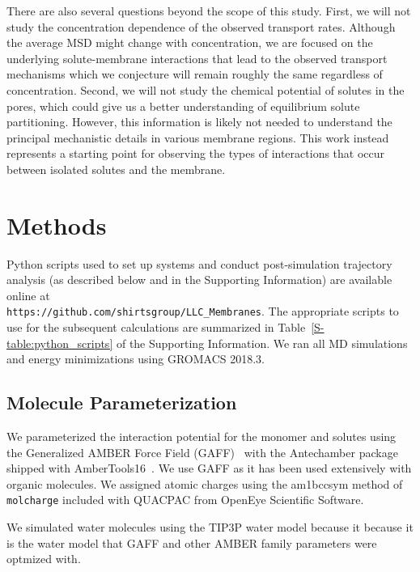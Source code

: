 \documentclass[journal=jpcbfk,manuscript=article]{achemso}
\begin{document}
  There are also several questions beyond the scope of this study.
  First, we will not study the concentration dependence of the observed transport
  rates. Although the average MSD might change with concentration, we are 
  focused on the underlying solute-membrane interactions that lead to the 
  observed transport mechanisms which we conjecture will remain roughly
  the same regardless of concentration. Second, we will not study the chemical potential
  of solutes in the pores, which could give us a better understanding of 
  equilibrium solute partitioning. However, this information is likely
  not needed to understand the principal mechanistic details in various membrane
  regions. This work instead represents a starting point for observing the 
  types of interactions that occur between isolated solutes and the membrane.

  \section{Methods}
  
  Python scripts used to set up systems and conduct post-simulation trajectory 
  analysis (as described below and in the Supporting Information) are available 
  online at \\
  \texttt{https://github.com/shirtsgroup/LLC\_Membranes}. The 
  appropriate scripts to use for the subsequent calculations are summarized in 
  Table~\ref{S-table:python_scripts} of the Supporting Information. We ran all 
  MD simulations and energy minimizations using GROMACS 2018.3.~\cite{bekker_gromacs:_1993,berendsen_gromacs:_1995,van_der_spoel_gromacs:_2005,hess_gromacs_2008} 
  
  \subsection{Molecule Parameterization}\label{method:parameterization}
  
  We parameterized the interaction potential for the monomer and solutes using
  the Generalized AMBER Force Field (GAFF)~\cite{wang_development_2004} with the
  Antechamber package \cite{wang_automatic_2006} shipped with
  AmberTools16~\cite{case_ambertools16_2016}.  We use GAFF as it has been used
  extensively with organic molecules.  We assigned atomic charges using the
  am1bccsym method of \texttt{molcharge} included with QUACPAC from OpenEye
  Scientific Software.
  
  We simulated water molecules using the TIP3P water model because it because
  it is the water model that GAFF and other AMBER family parameters were optmized 
  with.~\cite{florova_explicit_2010} %
  
\end{document}
